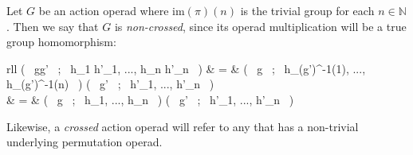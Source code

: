 \begin{defn} Let $G$ be an action operad where $\mathrm{im}(\pi)(n)$ is the trivial group for each $n \in \mathbb{N}$. Then we say that $G$ is \emph{non-crossed}, since its operad multiplication will be a true group homomorphism:
\begin{eq*} \begin{array}{rll}
			\mu( \, gg' \, ; \, h_1 h'_1, ..., h_n h'_n \, ) & = & \mu( \, g \, ; \, h_{\pi(g')^{-1}(1)}, ..., h_{\pi(g')^{-1}(n)} \, ) \mu( \, g' \, ; \, h'_1, ..., h'_n \, ) \\
			& = & \mu( \, g \, ; \, h_1, ..., h_n \, ) \mu( \, g' \, ; \, h'_1, ..., h'_n \, ) \\
		\end{array}
\end{eq*}
Likewise, a \emph{crossed} action operad will refer to any that has a non-trivial underlying permutation operad.
\end{defn}

